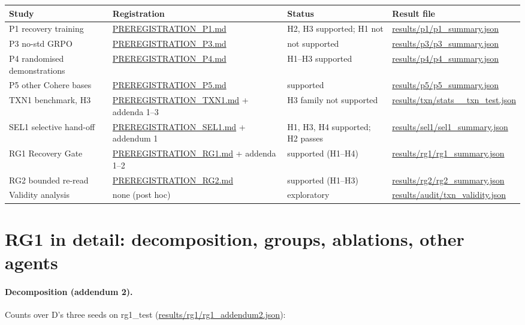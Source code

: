 \documentclass[11pt]{article}
\begin{document}
\begin{center}\footnotesize
\begin{tabular}{@{}p{}p{}p{}p{}@{}}
\toprule
Study & Registration & Status & Result file \\
\midrule
P1 recovery training & \url{PREREGISTRATION_P1.md} & H2, H3 supported; H1 not & \url{results/p1/p1_summary.json} \\
P3 no-std GRPO & \url{PREREGISTRATION_P3.md} & not supported & \url{results/p3/p3_summary.json} \\
P4 randomised demonstrations & \url{PREREGISTRATION_P4.md} & H1--H3 supported & \url{results/p4/p4_summary.json} \\
P5 other Cohere bases & \url{PREREGISTRATION_P5.md} & supported & \url{results/p5/p5_summary.json} \\
TXN1 benchmark, H3 & \url{PREREGISTRATION_TXN1.md} + addenda 1--3 & H3 family not supported & \url{results/txn/stats__txn_test.json} \\
SEL1 selective hand-off & \url{PREREGISTRATION_SEL1.md} + addendum 1 & H1, H3, H4 supported; H2 passes & \url{results/sel1/sel1_summary.json} \\
RG1 Recovery Gate & \url{PREREGISTRATION_RG1.md} + addenda 1--2 & supported (H1--H4) & \url{results/rg1/rg1_summary.json} \\
RG2 bounded re-read & \url{PREREGISTRATION_RG2.md} & supported (H1--H3) & \url{results/rg2/rg2_summary.json} \\
Validity analysis & none (post hoc) & exploratory & \url{results/audit/txn_validity.json} \\
\bottomrule
\end{tabular}
\end{center}

\section{RG1 in detail: decomposition, groups, ablations, other agents}
\label{app:rg1}

\paragraph{Decomposition (addendum 2).} Counts over D's three seeds on rg1\_test (\url{results/rg1/rg1_addendum2.json}):
\end{document}
